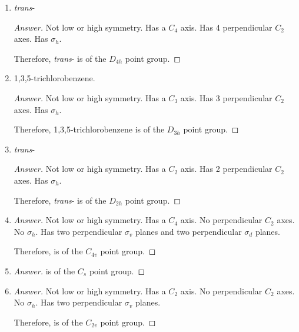 \documentclass[../psets.tex]{subfiles}
\begin{document}
\begin{enumerate}[label={\Roman*)}]
\begin{enumerate}[label={\alph*)}]
\begin{proof}[Answer]
        \end{proof}
        \item \emph{trans}-\ce{[CrCl2(H2O)4]+}
        \begin{proof}[Answer]
            Not low or high symmetry. Has a $C_4$ axis. Has 4 perpendicular $C_2$ axes. Has $\sigma_h$.\par
            Therefore, \emph{trans}-\ce{[CrCl2(H2O)4]+} is of the $D_{4h}$ point group.
        \end{proof}
        \item 1,3,5-trichlorobenzene.
        \begin{proof}[Answer]
            Not low or high symmetry. Has a $C_3$ axis. Has 3 perpendicular $C_2$ axes. Has $\sigma_h$.\par
            Therefore, 1,3,5-trichlorobenzene is of the $D_{3h}$ point group.
        \end{proof}
        \item \emph{trans}-
        \begin{proof}[Answer]
            Not low or high symmetry. Has a $C_2$ axis. Has 2 perpendicular $C_2$ axes. Has $\sigma_h$.\par
            Therefore, \emph{trans}- is of the $D_{2h}$ point group.
        \end{proof}
        \item {}
        \begin{proof}[Answer]
            Not low or high symmetry. Has a $C_4$ axis. No perpendicular $C_2$ axes. No $\sigma_h$. Has two perpendicular $\sigma_v$ planes and two perpendicular $\sigma_d$ planes.\par
            Therefore,  is of the $C_{4v}$ point group.
        \end{proof}
        \item {}
        \begin{proof}[Answer]
             is of the $C_s$ point group.
        \end{proof}
        \item {}
        \begin{proof}[Answer]
            Not low or high symmetry. Has a $C_2$ axis. No perpendicular $C_2$ axes. No $\sigma_h$. Has two perpendicular $\sigma_v$ planes.\par
            Therefore,  is of the $C_{2v}$ point group.
        \end{proof}
    \end{enumerate}

\end{enumerate}
\end{document}
